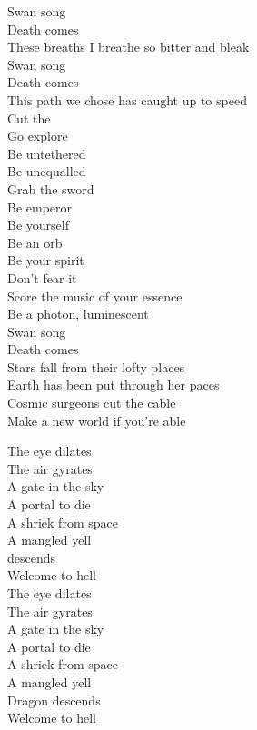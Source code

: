 Swan song\\
Death comes\\
These breaths I breathe so bitter and bleak\\
Swan song\\
Death comes\\
This path we chose has caught up to speed\\

Cut the \\
Go explore\\
Be untethered\\
Be unequalled\\
Grab the sword\\
Be emperor\\
Be yourself\\
Be an orb\\
Be your spirit\\
Don't fear it\\
Score the music of your essence\\
Be a photon, luminescent\\
Swan song\\
Death comes\\

Stars fall from their lofty places\\
Earth has been put through her paces\\
Cosmic surgeons cut the cable\\
Make a new world if you're able\\


The eye dilates\\
The air gyrates\\
A gate in the sky\\
A portal to die\\
A shriek from space\\
A mangled yell\\
 descends\\
Welcome to hell\\

The eye dilates\\
The air gyrates\\
A gate in the sky\\
A portal to die\\
A shriek from space\\
A mangled yell\\
Dragon descends\\
Welcome to hell\\

